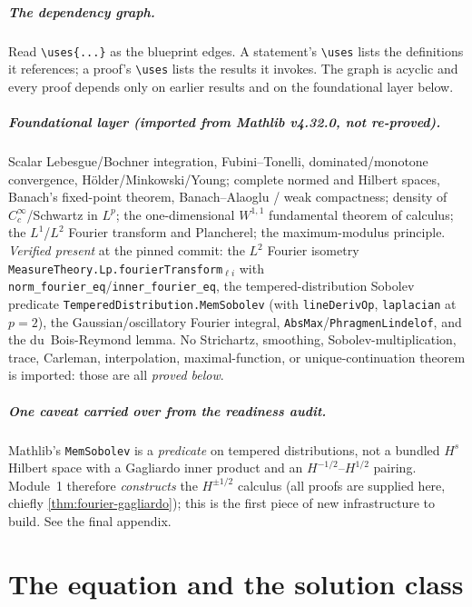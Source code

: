 \documentclass[11pt,oneside]{book}
\providecommand{\uses}[1]{}
\theoremstyle{definition}
\theoremstyle{remark}
\newcommand{\1}{\mathbf 1}
\begin{document}
\paragraph{The dependency graph.}
Read \verb|\uses{...}| as the blueprint edges. A statement's \verb|\uses| lists the definitions it references;
a proof's \verb|\uses| lists the results it invokes. The graph is acyclic and every proof depends only on
earlier results and on the foundational layer below.

\paragraph{Foundational layer (imported from Mathlib v4.32.0, not re-proved).}
Scalar Lebesgue/Bochner integration, Fubini--Tonelli, dominated/monotone convergence, H\"older/Minkowski/Young;
complete normed and Hilbert spaces, Banach's fixed-point theorem, Banach--Alaoglu / weak compactness; density of
$C_c^\infty$/Schwartz in $L^p$; the one-dimensional $W^{1,1}$ fundamental theorem of calculus; the $L^1$/$L^2$
Fourier transform and Plancherel; the maximum-modulus principle. \emph{Verified present} at the pinned commit:
the $L^2$ Fourier isometry \texttt{MeasureTheory.Lp.fourierTransform}$_{\ell i}$ with
\texttt{norm\_fourier\_eq}/\texttt{inner\_fourier\_eq}, the tempered-distribution Sobolev predicate
\texttt{TemperedDistribution.MemSobolev} (with \texttt{lineDerivOp}, \texttt{laplacian} at $p=2$), the
Gaussian/oscillatory Fourier integral, \texttt{AbsMax}/\texttt{PhragmenLindelof}, and the du~Bois-Reymond lemma.
No Strichartz, smoothing, Sobolev-multiplication, trace, Carleman, interpolation, maximal-function, or
unique-continuation theorem is imported: those are all \emph{proved below}.

\paragraph{One caveat carried over from the readiness audit.}
Mathlib's \texttt{MemSobolev} is a \emph{predicate} on tempered distributions, not a bundled $H^{s}$ Hilbert
space with a Gagliardo inner product and an $H^{-1/2}$--$H^{1/2}$ pairing. Module~1 therefore \emph{constructs}
the $H^{\pm1/2}$ calculus (all proofs are supplied here, chiefly \cref{thm:fourier-gagliardo}); this is the
first piece of new infrastructure to build. See the final appendix.

\tableofcontents
\mainmatter


\chapter{The equation and the solution class}\label{chap:setup}
\end{document}
